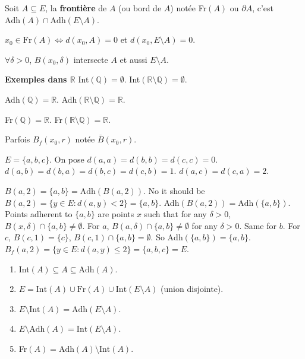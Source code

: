 \documentclass[oneside]{book}
\begin{document}
\begin{definition}
Soit $A \subseteq E$, la \textbf{frontière} de $A$ (ou bord de $A$) notée Fr$(A)$ ou $\partial A$, c'est $\text{Adh}(A) \cap \text{Adh}(E \setminus A)$.

$x_0 \in \text{Fr}(A) \iff d(x_0, A) = 0$ et $d(x_0, E \setminus A) = 0$.

$\forall \delta > 0$, $B(x_0, \delta)$ intersecte $A$ et aussi $E \setminus A$.
\end{definition}

\begin{example}
\textbf{Exemples dans $\mathbb{R}$}
Int$(\mathbb{Q}) = \emptyset$.
Int$(\mathbb{R} \setminus \mathbb{Q}) = \emptyset$.

Adh$(\mathbb{Q}) = \mathbb{R}$.
Adh$(\mathbb{R} \setminus \mathbb{Q}) = \mathbb{R}$.

Fr$(\mathbb{Q}) = \mathbb{R}$.
Fr$(\mathbb{R} \setminus \mathbb{Q}) = \mathbb{R}$.
\end{example}

Parfois $B_f(x_0, r)$ notée $\overline{B}(x_0, r)$.

\begin{example}
$E = \{a, b, c\}$.
On pose $d(a, a) = d(b, b) = d(c, c) = 0$.
$d(a, b) = d(b, a) = d(b, c) = d(c, b) = 1$.
$d(a, c) = d(c, a) = 2$.

$B(a, 2) = \{a, b\} = \text{Adh}(B(a, 2))$. No it should be $B(a,2) = \{y \in E : d(a,y) < 2\} = \{a, b\}$.  Adh$(B(a, 2)) = \text{Adh}(\{a,b\})$. Points adherent to $\{a,b\}$ are points $x$ such that for any $\delta>0$, $B(x,\delta) \cap \{a,b\} \ne \emptyset$.
For $a$, $B(a, \delta) \cap \{a,b\} \ne \emptyset$ for any $\delta > 0$. Same for $b$. For $c$, $B(c, 1) = \{c\}$, $B(c, 1) \cap \{a,b\} = \emptyset$. So $\text{Adh}(\{a,b\}) = \{a,b\}$.
$B_f(a, 2) = \{y \in E : d(a,y) \leq 2\} = \{a, b, c\} = E$.
\end{example}


\begin{proposition}
\begin{enumerate}
    \item Int$(A) \subseteq A \subseteq \text{Adh}(A)$.
    \item $E = \text{Int}(A) \cup \text{Fr}(A) \cup \text{Int}(E \setminus A)$ (union disjointe).
    \item $E \setminus \text{Int}(A) = \text{Adh}(E \setminus A)$.
    \item $E \setminus \text{Adh}(A) = \text{Int}(E \setminus A)$.
    \item Fr$(A) = \text{Adh}(A) \setminus \text{Int}(A)$.
\end{enumerate}
\end{proposition}
\end{document}
